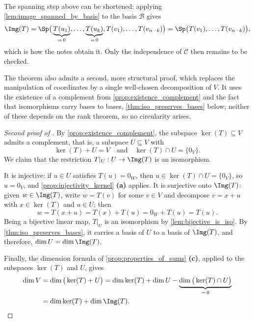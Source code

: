 \begin{remark}
The spanning step above can be shortened: applying \cref{lem:image_spanned_by_basis} to the basis $\mathcal{B}$ gives
\[
\Img(T) = \Sp\big(\underbrace{T(u_1)}_{= \, 0}, \dots, \underbrace{T(u_k)}_{= \, 0}, T(v_1), \dots, T(v_{n-k})\big) = \Sp\big(T(v_1), \dots, T(v_{n-k})\big),
\]
which is how the notes obtain it. Only the independence of $\mathcal{C}$ then remains to be checked.
\end{remark}

The theorem also admits a second, more structural proof, which replaces the manipulation of coordinates by a single well-chosen decomposition of $V$. It uses the existence of a complement from \cref{prop:existence_complement} and the fact that isomorphisms carry bases to bases, \cref{thm:iso_preserves_bases} below; neither of these depends on the rank theorem, so no circularity arises.

\begin{proof}[Second proof of ]
By \cref{prop:existence_complement}, the subspace $\ker(T) \subseteq V$ admits a complement, that is, a subspace $U \subseteq V$ with
\[
\ker(T) + U = V \quad \text{and} \quad \ker(T) \cap U = \{0_V\}.
\]
We claim that the restriction $T|_U: U \to \Img(T)$ is an isomorphism.

It is injective: if $u \in U$ satisfies $T(u) = 0_W$, then $u \in \ker(T) \cap U = \{0_V\}$, so $u = 0_V$, and \cref{prop:injectivity_kernel} \textbf{(a)} applies. It is surjective onto $\Img(T)$: given $w \in \Img(T)$, write $w = T(v)$ for some $v \in V$ and decompose $v = x + u$ with $x \in \ker(T)$ and $u \in U$; then
\[
w = T(x + u) = T(x) + T(u) = 0_W + T(u) = T(u).
\]
Being a bijective linear map, $T|_U$ is an isomorphism by \cref{lem:bijective_is_iso}. By \cref{thm:iso_preserves_bases}, it carries a basis of $U$ to a basis of $\Img(T)$, and therefore, $\dim U = \dim \Img(T)$.

Finally, the dimension formula of \cref{prop:properties_of_sums} \textbf{(c)}, applied to the subspaces $\ker(T)$ and $U$, gives
\begin{align*}
\dim V &= \dim\big(\ker(T) + U\big) = \dim \ker(T) + \dim U - \underbrace{\dim\big(\ker(T) \cap U\big)}_{= \, 0} \\
&= \dim \ker(T) + \dim \Img(T). \qedhere
\end{align*}
\end{proof}

